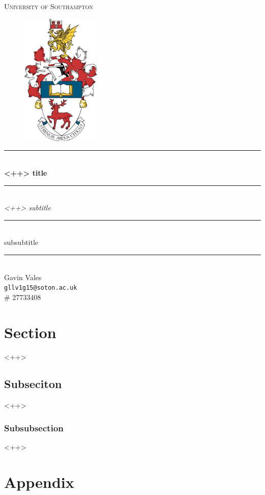 \documentclass[a4paper]{article}
\begin{document}
\begin{titlepage}
\begin{center}
\hfill\\
\hfill\\
{\Huge \textsc{University of Southampton}}\\
[1em]

\begin{figure}[H]
    \centering
    \includegraphics[height=2.5in]{logo}
    \label{fig:logo}
\end{figure}

\rule{\textwidth}{2pt}\\
[3em]
{\LARGE \textbf{ <++> title}}\\
[2em]
\rule{\textwidth}{2pt}\\
[1em]
{\Large \textit{ <++> subtitle}}\\
[0.5em]
\rule{0.5\textwidth}{1pt}\\
[1em]
\vfill
{\Large  <++>subsubtitle}\\
\rule{\textwidth}{0.5pt}\\
Gavin Vales\\
\texttt{gllv1g15@soton.ac.uk}\\
\# 27733408
\end{center}

\end{titlepage}

\tableofcontents
\newpage

\section{Section}
<++>

\subsection{Subseciton}
<++> 

\subsubsection{Subsubsection}
<++> 

\parencite{jenkins2003}

\newpage

\printbibliography

\newpage

\appendix
{}

\section{Appendix}
\end{document}
